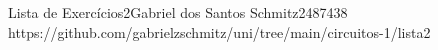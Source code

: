 \documentclass{article}
\begin{document}
{Lista de Exercícios}{2}{Gabriel dos Santos Schmitz}{2487438}
{https://github.com/gabrielzschmitz/uni/tree/main/circuitos-1/lista2}




\newpage
\printbibliography[title=Referências]
\end{document}
